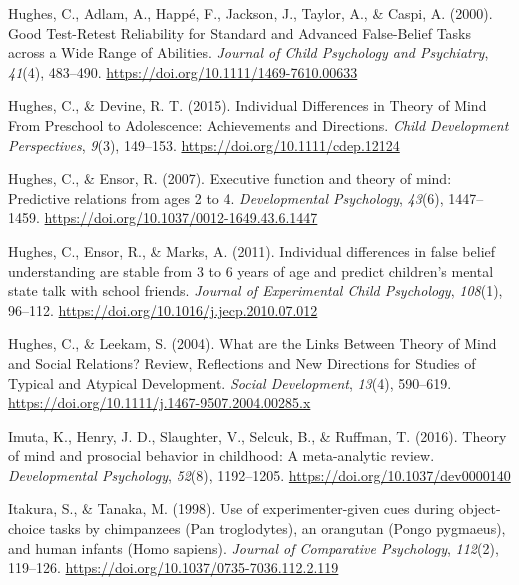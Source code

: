 \documentclass[
  man,floatsintext]{apa7}
\newlength{\cslhangindent}
\newlength{\cslentryspacingunit} %
\newenvironment{CSLReferences}[2] %
 {%
  \setlength{\parindent}{0pt}
  \ifodd #1
  \let\oldpar\par
  \def\par{\hangindent=\cslhangindent\oldpar}
  \fi
  \setlength{\parskip}{#2\cslentryspacingunit}
 }%
 {}
\begin{document}
\begin{CSLReferences}{1}{0}
\leavevmode{}%
Hughes, C., Adlam, A., Happé, F., Jackson, J., Taylor, A., \& Caspi, A. (2000). Good {Test}-{Retest Reliability} for {Standard} and {Advanced False}-{Belief Tasks} across a {Wide Range} of {Abilities}. \emph{Journal of Child Psychology and Psychiatry}, \emph{41}(4), 483--490. \url{https://doi.org/10.1111/1469-7610.00633}

\leavevmode{}%
Hughes, C., \& Devine, R. T. (2015). Individual {Differences} in {Theory} of {Mind From Preschool} to {Adolescence}: {Achievements} and {Directions}. \emph{Child Development Perspectives}, \emph{9}(3), 149--153. \url{https://doi.org/10.1111/cdep.12124}

\leavevmode{}%
Hughes, C., \& Ensor, R. (2007). Executive function and theory of mind: {Predictive} relations from ages 2 to 4. \emph{Developmental Psychology}, \emph{43}(6), 1447--1459. \url{https://doi.org/10.1037/0012-1649.43.6.1447}

\leavevmode{}%
Hughes, C., Ensor, R., \& Marks, A. (2011). Individual differences in false belief understanding are stable from 3 to 6 years of age and predict children's mental state talk with school friends. \emph{Journal of Experimental Child Psychology}, \emph{108}(1), 96--112. \url{https://doi.org/10.1016/j.jecp.2010.07.012}

\leavevmode{}%
Hughes, C., \& Leekam, S. (2004). What are the {Links Between Theory} of {Mind} and {Social Relations}? {Review}, {Reflections} and {New Directions} for {Studies} of {Typical} and {Atypical Development}. \emph{Social Development}, \emph{13}(4), 590--619. \url{https://doi.org/10.1111/j.1467-9507.2004.00285.x}

\leavevmode{}%
Imuta, K., Henry, J. D., Slaughter, V., Selcuk, B., \& Ruffman, T. (2016). Theory of mind and prosocial behavior in childhood: {A} meta-analytic review. \emph{Developmental Psychology}, \emph{52}(8), 1192--1205. \url{https://doi.org/10.1037/dev0000140}

\leavevmode{}%
Itakura, S., \& Tanaka, M. (1998). Use of experimenter-given cues during object-choice tasks by chimpanzees ({Pan} troglodytes), an orangutan ({Pongo} pygmaeus), and human infants ({Homo} sapiens). \emph{Journal of Comparative Psychology}, \emph{112}(2), 119--126. \url{https://doi.org/10.1037/0735-7036.112.2.119}


\end{CSLReferences}
\end{document}
